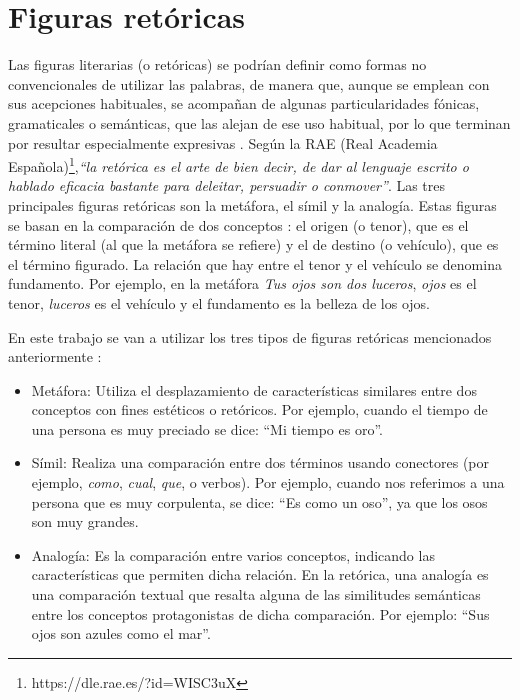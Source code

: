 



\section{Figuras retóricas}
\label{cap:sec:figurasretoricas}

Las figuras literarias (o retóricas) se podrían definir como formas no convencionales de utilizar las palabras, de manera que, aunque se emplean con sus acepciones habituales, se acompañan de algunas particularidades fónicas, gramaticales o semánticas, que las alejan de ese uso habitual, por lo que terminan por resultar especialmente expresivas \citep{GalianaYCasas1994}. 
Según la RAE (Real Academia Española)\footnote{https://dle.rae.es/?id=WISC3uX},\textit{``la retórica es el arte de bien decir, de dar al lenguaje escrito o hablado eficacia bastante para deleitar, persuadir o conmover''}.
Las tres principales figuras retóricas son la metáfora, el símil y la analogía. Estas figuras se basan en la comparación de dos conceptos  \citep{GalianaYCasas1994}: el origen (o tenor), que es el término literal (al que la metáfora se refiere) y el de destino (o vehículo), que es el término figurado. La relación que hay entre el tenor y el vehículo se denomina fundamento. Por ejemplo, en la metáfora \textit{Tus ojos son dos luceros}, \textit{ojos} es el tenor, \textit{luceros} es el vehículo y el fundamento es la belleza de los ojos.


En este trabajo se van a utilizar los tres tipos de figuras retóricas mencionados anteriormente \citep{TFMPaloma}: 
\begin{itemize}
	\item Metáfora: Utiliza el desplazamiento de características similares entre dos conceptos con fines estéticos o retóricos. Por ejemplo, cuando el tiempo de una persona es muy preciado se dice: ``Mi tiempo es oro''.
	
	\item Símil: Realiza una comparación entre dos términos usando conectores (por ejemplo, \textit{como}, \textit{cual}, \textit{que}, o verbos).
	Por ejemplo, cuando nos referimos a una persona que es muy corpulenta, se dice: ``Es como un oso'', ya que los osos son muy grandes.
	
	\item Analogía: Es la comparación entre varios conceptos, indicando las características que permiten dicha relación. En la retórica, una analogía es una comparación textual que resalta alguna de las similitudes semánticas entre los conceptos protagonistas de dicha comparación. Por ejemplo: ``Sus ojos son azules como el mar''.
	
\end{itemize}

